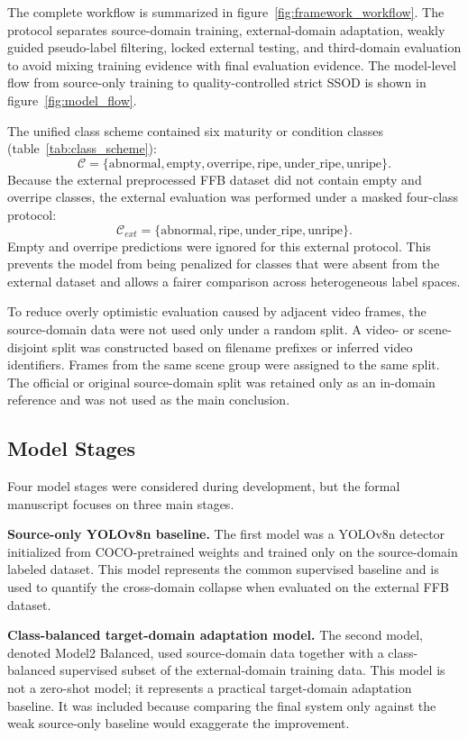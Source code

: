 ﻿\documentclass[12pt]{article}
\begin{document}
The complete workflow is summarized in figure~\ref{fig:framework_workflow}. The protocol separates source-domain training, external-domain adaptation, weakly guided pseudo-label filtering, locked external testing, and third-domain evaluation to avoid mixing training evidence with final evaluation evidence. The model-level flow from source-only training to quality-controlled strict SSOD is shown in figure~\ref{fig:model_flow}.

The unified class scheme contained six maturity or condition classes (table~\ref{tab:class_scheme}):
\[
\mathcal{C}=\{\text{abnormal},\text{empty},\text{overripe},\text{ripe},\text{under\_ripe},\text{unripe}\}.
\]
Because the external preprocessed FFB dataset did not contain empty and overripe classes, the external evaluation was performed under a masked four-class protocol:
\[
\mathcal{C}_{ext}=\{\text{abnormal},\text{ripe},\text{under\_ripe},\text{unripe}\}.
\]
Empty and overripe predictions were ignored for this external protocol. This prevents the model from being penalized for classes that were absent from the external dataset and allows a fairer comparison across heterogeneous label spaces.

To reduce overly optimistic evaluation caused by adjacent video frames, the source-domain data were not used only under a random split. A video- or scene-disjoint split was constructed based on filename prefixes or inferred video identifiers. Frames from the same scene group were assigned to the same split. The official or original source-domain split was retained only as an in-domain reference and was not used as the main conclusion.

\subsection{Model Stages}

Four model stages were considered during development, but the formal manuscript focuses on three main stages.

\textbf{Source-only YOLOv8n baseline.} The first model was a YOLOv8n detector initialized from COCO-pretrained weights and trained only on the source-domain labeled dataset. This model represents the common supervised baseline and is used to quantify the cross-domain collapse when evaluated on the external FFB dataset.

\textbf{Class-balanced target-domain adaptation model.} The second model, denoted Model2 Balanced, used source-domain data together with a class-balanced supervised subset of the external-domain training data. This model is not a zero-shot model; it represents a practical target-domain adaptation baseline. It was included because comparing the final system only against the weak source-only baseline would exaggerate the improvement.
\end{document}
